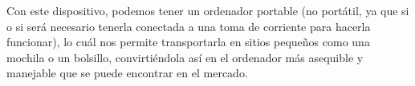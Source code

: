 Con este dispositivo, podemos tener un ordenador portable (no portátil, ya que si o si será necesario tenerla conectada a una toma de corriente para hacerla funcionar), lo cuál nos permite transportarla en sitios pequeños como una mochila o un bolsillo,
convirtiéndola así en el ordenador más asequible y manejable que se puede encontrar en el mercado.


\clearpage